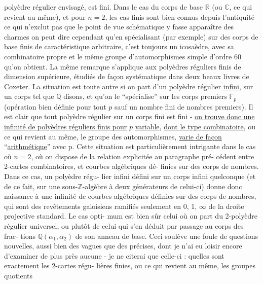 
polyèdre régulier envisagé, est fini. Dans le cas du corps de
base $\mathbb{R}$ (ou $\mathbb{C}$, ce qui revient au même), et pour $n = 2$, les cas
finis sont bien connus depuis l'antiquité - ce qui n'exclut pas
que le point de vue schématique y fasse apparaître des charmes
 on peut dire cependant qu'en spécialisant 
(par exemple) sur des corps de base finis de caractéristique
arbitraire, c'est toujours un icosaèdre, avec sa combinatoire
propre et le même groupe d'automorphismes simple d'ordre 60 qu'on
obtient. La même remarque s'applique aux polyèdres réguliers finis
de dimension supérieure, étudiés de façon systématique dans deux
beaux livres de Coxeter. La situation est toute autre si on part
d'un polyèdre régulier \uline{infini}, sur un corps tel que $\mathbb{Q}$ disons,
et qu'on le ``spécialise'' sur les corps premiers $\mathbb{F}_p$ (opération
bien définie pour tout $p$ sauf un nombre fini de nombres premiers).
Il est clair que tout polyèdre régulier sur un corps fini est fini -
\uline{on trouve donc une infinité de polyèdres réguliers finis pour} $p$
\uline{variable}, \uline{dont le type combinatoire}, ou ce qui revient au même,
le groupe des automorphismes, \uline{varie de façon} ``\uline{arithmétique}'' avec p.
Cette situation est particulièrement intrigante  dans le cas où
$n = 2$, où on dispose de la relation explicitée au paragraphe pré-%
cédent entre 2-cartes combinatoires, et courbes algébriques dé-%
finies sur des corps de nombres. Dans ce cas, un polyèdre régu-%
lier infini défini sur un corps infini quelconque (et de ce fait,
sur une sous-$\mathbb{Z}$-algèbre à deux générateurs de celui-ci) donne donc
naissance à une infinité de courbes algébriques définies sur des
corps de nombres, qui sont des revêtements galoisiens ramifiés
seulement en 0, 1, $\infty$ de la droite projective standard. Le cas opti-%
mum est bien sûr celui où on part du 2-polyèdre régulier universel,
ou plutôt de celui qui s'en déduit par passage au corps des frac-%
tions $\mathbb{Q}(\alpha_1,\alpha_2)$ de son anneau de base. Ceci soulève une foule de
questions nouvelles, aussi bien des vagues que des précises, dont
je n'ai eu loisir encore d'examiner de plus près aucune - je ne
citerai que celle-ci : quelles sont exactement les 2-cartes régu-%
lières finies, ou ce qui revient au même, les groupes quotients


